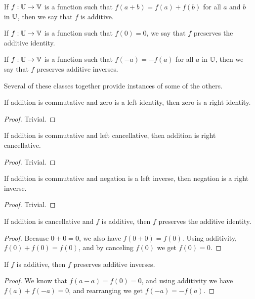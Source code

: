 \documentclass[../math.tex]{subfiles}
\begin{document}
\begin{class}
    If $f : \mathbb{U} \to \mathbb{V}$ is a function such that $f(a + b) = f(a) + f(b)$ for all
    $a$ and $b$ in $\mathbb{U}$, then we say that $f$ is additive.
\end{class}

\begin{class}
    If $f : \mathbb{U} \to \mathbb{V}$ is a function such that $f(0) = 0$, we say that $f$
    preserves the additive identity.
\end{class}

\begin{class}
    If $f : \mathbb{U} \to \mathbb{V}$ is a function such that $f(-a) = -f(a)$ for all $a$ in
    $\mathbb{U}$, then we say that $f$ preserves additive inverses.
\end{class}

Several of these classes together provide instances of some of the others.

\begin{instance}
    If addition is commutative and zero is a left identity, then zero is a right
    identity.
\end{instance}
\begin{proof}
    Trivial.
\end{proof}

\begin{instance}
    If addition is commutative and left cancellative, then addition is right
    cancellative.
\end{instance}
\begin{proof}
    Trivial.
\end{proof}

\begin{instance}
    If addition is commutative and negation is a left inverse, then negation is
    a right inverse.
\end{instance}
\begin{proof}
    Trivial.
\end{proof}

\begin{instance}
    If addition is cancellative and $f$ is additive, then $f$ preserves the
    additive identity.
\end{instance}
\begin{proof}
    Because $0 + 0 = 0$, we also have $f(0 + 0) = f(0)$.  Using additivity,
    $f(0) + f(0) = f(0)$, and by canceling $f(0)$ we get $f(0) = 0$.
\end{proof}

\begin{instance}
    If $f$ is additive, then $f$ preserves additive inverses.
\end{instance}
\begin{proof}
    We know that $f(a - a) = f(0) = 0$, and using additivity we have $f(a) +
    f(-a) = 0$, and rearranging we get $f(-a) = -f(a)$.
\end{proof}
\end{document}

